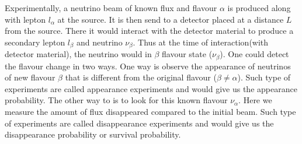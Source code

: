 \documentclass[12pt,a4paper]{report}
\begin{document}
Experimentally, a neutrino beam of known flux and flavour $\alpha$ is produced along with lepton $l_{\alpha}$ at the source. It is then send to a detector placed at a distance $L$ from the source. There it would interact with the detector material to produce a secondary lepton $l_{\beta}$ and neutrino $\nu_{\beta}$.  Thus at the time of interaction(with detector material), the neutrino would in $\beta$ flavour state ($\nu_{\beta}$). One could detect the flavour change in two ways. One way is observe the appearance of neutrinos of new flavour $\beta$ that is different from the original flavour ($\beta\neq\alpha$). Such type of experiments are called appearance experiments and would give us the appearance probability. The other way to is to look for this known flavour $\nu_{\alpha}$. Here we measure the amount of flux disappeared compared to the initial beam. Such type of experiments are called disappearance experiments and would give us the disappearance probability or survival probability.
\end{document}
